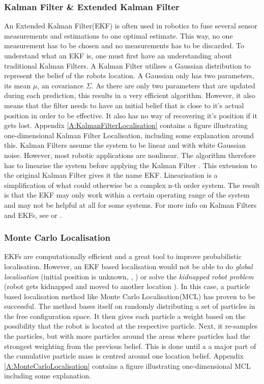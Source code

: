 \subsubsection{Kalman Filter \& Extended Kalman Filter}
An Extended Kalman Filter(EKF) is often used in robotics to fuse several sensor measurements and estimations to one optimal estimate. This way, no one measurement has to be chosen and no measurements has to be discarded. To understand what an EKF is, one must first have an understanding about traditional Kalman Filters. A Kalman Filter utilises a Gaussian distribution to represent the belief of the robots location. A Gaussian only has two parameters, its mean $\mu$, an covariance $\Sigma$. As there are only two parameters that are updated during each prediction, this results in a very efficient algorithm. However, it also means that the filter needs to have an initial belief that is close to it's actual position in order to be effective. It also has no way of recovering it's position if it gets lost. Appendix \ref{A:KalmanFilterLocalisation} contains a figure illustrating one-dimensional Kalman Filter Localisation, including some explanation around this.
Kalman Filters assume the system to be linear and with white Gaussian noise. However, most robotic applications are nonlinear. The algorithm therefore has to linearise the system before applying the Kalman Filter \cite{SiegwartRoland2011Itam}. This extension to the original Kalman Filter gives it the name EKF. Linearisation is a simplification of what could otherwise be a complex n-th order system. The result is that the EKF may only work within a certain operating range of the system and may not be helpful at all for some systems. For more info on Kalman Filters and EKFs, see \cite{SiegwartRoland2011Itam} or \cite{ThrunSebastian2005Pr}.

\subsubsection{Monte Carlo Localisation}
EKFs are computationally efficient and a great tool to improve probabilistic localisation. However, an EKF based localisation would not be able to do \textit{global localisation} (initial position is unknown, \cite{SiegwartRoland2011Itam}, \cite{ThrunSebastian2005Pr}) or solve the \textit{kidnapped robot problem} (robot gets kidnapped and moved to another location \cite{SiegwartRoland2011Itam} \cite{ThrunSebastian2005Pr}). In this case, a particle based localisation method like Monte Carlo Localisation(MCL) has proven to be successful. The method bases itself on randomly distributing a set of particles in the free configuration space. It then gives each particle a weight based on the possibility that the robot is located at the respective particle. Next, it re-samples the particles, but with more particles around the areas where particles had the strongest weighting from the previous belief. This is done until a a major part of the cumulative particle mass is centred around one location belief. Appendix \ref{A:MonteCarloLocalisation} contains a figure illustrating one-dimensional MCL including some explanation.

